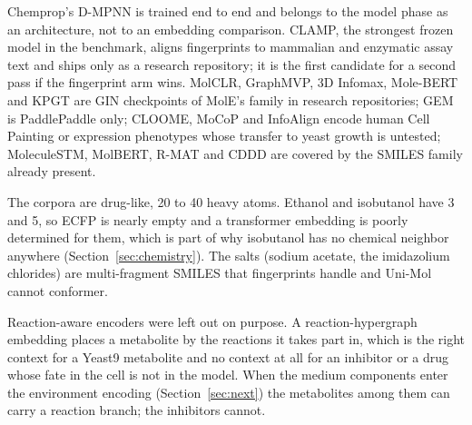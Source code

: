 \begin{table}[htbp]
\centering
\footnotesize
\caption{Provenance of the twelve encoders: representation family, training corpus,
objective, an approximate citation band as of September 2026 (a band, not a count),
and the source. \tcflagext~Temporary: the linked works are not yet in the library
mirror and are given by their public link; the flag lifts when they are mirrored and
cited through the bibliography.}
\label{tab:provenance}

\end{table}

Chemprop's D-MPNN is trained end to end and belongs to the model phase as an
architecture, not to an embedding comparison. CLAMP, the strongest frozen model in the
benchmark, aligns fingerprints to mammalian and enzymatic assay text and ships only as
a research repository; it is the first candidate for a second pass if the fingerprint
arm wins. MolCLR, GraphMVP, 3D Infomax, Mole-BERT and KPGT are GIN checkpoints of
MolE's family in research repositories; GEM is PaddlePaddle only; CLOOME, MoCoP and
InfoAlign encode human Cell Painting or expression phenotypes whose transfer to yeast
growth is untested; MoleculeSTM, MolBERT, R-MAT and CDDD are covered by the SMILES
family already present.

The corpora are drug-like, 20 to 40 heavy atoms. Ethanol and isobutanol have 3 and 5,
so ECFP is nearly empty and a transformer embedding is poorly determined for them,
which is part of why isobutanol has no chemical neighbor anywhere
(Section~\ref{sec:chemistry}). The salts (sodium acetate, the imidazolium chlorides)
are multi-fragment SMILES that fingerprints handle and Uni-Mol cannot conformer.

Reaction-aware encoders were left out on purpose. A reaction-hypergraph embedding places
a metabolite by the reactions it takes part in, which is the right context for a
Yeast9 metabolite and no context at all for an inhibitor or a drug whose fate in the
cell is not in the model. When the medium components enter the environment encoding
(Section~\ref{sec:next}) the metabolites among them can carry a reaction branch; the
inhibitors cannot.

\begin{table}[htbp]
\centering
\footnotesize
\caption{Coverage of every encoder over the compounds of the three datasets (distinct
InChIKeys with a dosed record: 41, 114 and 290; 343 in the union). Seconds are wall
time over the union on one shared GPU, model load excluded.}
\label{tab:coverage}

\end{table}

